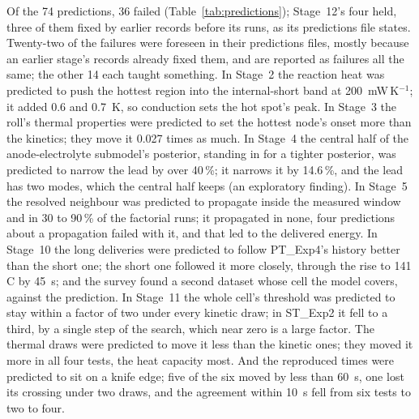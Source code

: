 \documentclass[preprint,12pt]{elsarticle}
\newcommand{\degC}{\,\textdegree C}
\begin{document}
Of the 74 predictions, 36 failed (Table~\ref{tab:predictions}); Stage~12's four held, three of them fixed by earlier records before its runs, as its predictions file states. Twenty-two of the failures were foreseen in their predictions files, mostly because an earlier stage's records already fixed them, and are reported as failures all the same; the other 14 each taught something. In Stage~2 the reaction heat was predicted to push the hottest region into the internal-short band at 200~mW\,K$^{-1}$; it added 0.6 and 0.7~K, so conduction sets the hot spot's peak. In Stage~3 the roll's thermal properties were predicted to set the hottest node's onset more than the kinetics; they move it 0.027 times as much. In Stage~4 the central half of the anode-electrolyte submodel's posterior, standing in for a tighter posterior, was predicted to narrow the lead by over 40\,\%; it narrows it by 14.6\,\%, and the lead has two modes, which the central half keeps (an exploratory finding). In Stage~5 the resolved neighbour was predicted to propagate inside the measured window and in 30 to 90\,\% of the factorial runs; it propagated in none, four predictions about a propagation failed with it, and that led to the delivered energy. In Stage~10 the long deliveries were predicted to follow PT\_Exp4's history better than the short one; the short one followed it more closely, through the rise to 141\degC{} by 45~s; and the survey found a second dataset whose cell the model covers, against the prediction. In Stage~11 the whole cell's threshold was predicted to stay within a factor of two under every kinetic draw; in ST\_Exp2 it fell to a third, by a single step of the search, which near zero is a large factor. The thermal draws were predicted to move it less than the kinetic ones; they moved it more in all four tests, the heat capacity most. And the reproduced times were predicted to sit on a knife edge; five of the six moved by less than 60~s, one lost its crossing under two draws, and the agreement within 10~s fell from six tests to two to four.
\end{document}
